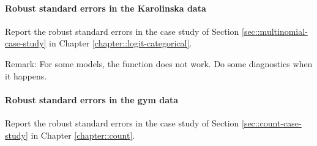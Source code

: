  


\paragraph{Robust standard errors in the Karolinska data}\label{hw20::robust-se-karolinska}

Report the robust standard errors in the case study of Section \ref{sec::multinomial-case-study} in Chapter \ref{chapter::logit-categorical}. 

Remark: 
For some models, the function  does not work. Do some diagnostics when it happens. 





\paragraph{Robust standard errors in the gym data}

Report the robust standard errors in the case study of Section \ref{sec::count-case-study} in Chapter \ref{chapter::count}. 



 
